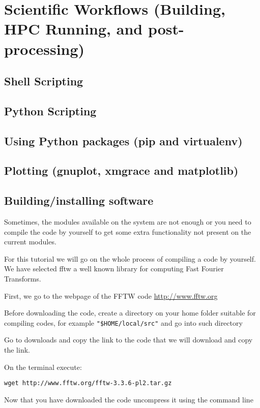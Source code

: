 \chapter{Scientific Workflows (Building, HPC Running, and post-processing)}

\section{Shell Scripting}

\section{Python Scripting}

\section{Using Python packages (pip and virtualenv)}

\section{Plotting (gnuplot, xmgrace and matplotlib)}

\section{Building/installing software}
Sometimes, the modules available on the system are not enough or you need to compile the code by yourself to get some extra functionality not present on the current modules. 

For this tutorial we will go on the whole process of compiling a code by yourself.
We have selected fftw a well known library for computing Fast Fourier Transforms. 

First, we go to the webpage of the FFTW code \url{http://www.fftw.org}

Before downloading the code, create a directory on your home folder suitable for compiling codes, for example \verb|"$HOME/local/src"| and go into such directory

Go to downloads and copy the link to the code that we will download and copy the link.

On the terminal execute:

\begin{lstlisting}
wget http://www.fftw.org/fftw-3.3.6-pl2.tar.gz
\end{lstlisting}

Now that you have downloaded the code uncompress it using the command line

